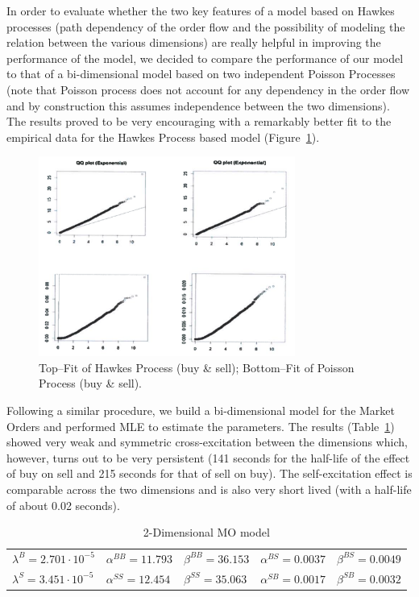 In order to evaluate whether the two key features of a model based on Hawkes processes (path dependency of the order flow and the possibility of modeling the relation between the various dimensions) are really helpful in improving the performance of the model, we decided to compare the performance of our model to that of a bi-dimensional model based on two independent Poisson Processes (note that Poisson process does not account for any dependency in the order flow and by construction this assumes independence between the two dimensions). The results proved to be very encouraging with a remarkably better fit to the empirical data for the Hawkes Process based model (Figure~\ref{fig:4hawkes6}).
	\begin{figure}[!ht]
   	\centering
   	\includegraphics[width=0.75\textwidth]{chapters/chapter_trade_data_models/figures/4hawkes6.png} 
   	\caption{Top--Fit of Hawkes Process (buy \& sell); Bottom--Fit of Poisson Process (buy \& sell).\label{fig:4hawkes6}}
	\end{figure}


Following a similar procedure, we build a bi-dimensional model for the Market Orders and performed MLE to estimate the parameters. The results (Table~\ref{tab:2dimmomod}) showed very weak and symmetric cross-excitation between the dimensions which, however, turns out to be very persistent (141 seconds for the half-life of the effect of buy on sell and 215 seconds for that of sell on buy). The self-excitation effect is comparable across the two dimensions and is also very short lived (with a half-life of about 0.02 seconds).
	\begin{table}
	\centering
	\caption{2-Dimensional MO model\label{tab:2dimmomod}}
	\begin{tabular}{lllll}  
	$\lambda^B=2.701 \cdot 10^{-5}$ & $\alpha^{BB}=11.793$ & $\beta^{BB}=36.153$ & $\alpha^{BS}=0.0037$ & $\beta^{BS}=0.0049$ \\
	$\lambda^S=3.451 \cdot 10^{-5}$ & $\alpha^{SS}=12.454$ & $\beta^{SS}=35.063$ & $\alpha^{SB}=0.0017$ & $\beta^{SB}=0.0032$
	\end{tabular}
	\end{table}
	

